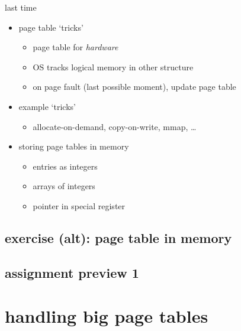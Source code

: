 \date{}
\title{}
\date{}

\begin{frame}
    \titlepage
\end{frame}



\begin{frame}{last time}
    \begin{itemize}
    \item page table `tricks'
        \begin{itemize}
        \item page table for \textit{hardware}
        \item OS tracks logical memory in other structure
        \item on page fault (last possible moment), update page table
        \end{itemize}
    \item example `tricks'
        \begin{itemize}
        \item allocate-on-demand, copy-on-write, mmap, \ldots
        \end{itemize}
    \item storing page tables in memory
        \begin{itemize}
        \item entries as integers
        \item arrays of integers
        \item pointer in special register
        \end{itemize}
    \end{itemize}
\end{frame}

\subsection{exercise (alt): page table in memory}


\subsection{assignment preview 1}





\section{handling big page tables}
